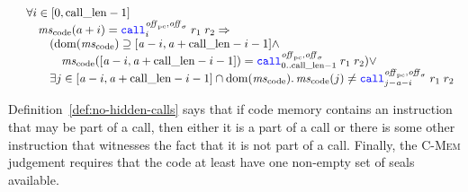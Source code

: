 \documentclass{jfp}
\newenvironment{jversion}{}{}
\begin{document}
\begin{jversion}
\begin{definition}
\[\begin{array}{l}
      \quad \forall i \in [0,\calllen - 1] \\
      \qquad \mscode(a + i) = \scall[i]{\offpc,\offsigma}{r_1}{r_2} \Rightarrow \\
      \qquad \quad (\dom(\mscode) \supseteq [\aaddr-i,\aaddr + \calllen - i - 1] \wedge\\
      \qquad \qquad \mscode([\aaddr-i,\aaddr + \calllen - i -1]) =
      \scall[0..\calllen-1]{\offpc,\offsigma}{r_1}{r_2}) \vee\\
      \qquad \quad \exists j \in [\aaddr-i,\aaddr + \calllen - i -1] \cap \dom(\mscode) \ldotp \mscode(j) \neq  \scall[j-\aaddr-i]{\offpc,\offsigma}{r_1}{r_2}
    \end{array}
  \]
\end{definition}
Definition~\ref{def:no-hidden-calls} says that if code memory contains an instruction that may be part of a call, then either it is a part of a call or there is some other instruction that witnesses the fact that it is not part of a call.
Finally, the \textsc{C-Mem} judgement requires that the code at least have one non-empty set of seals available.

\end{jversion}
\end{document}
